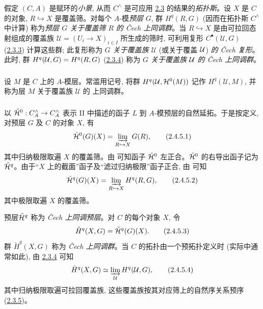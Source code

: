 \subsubsection{}
假定 $(C, A)$ 是赋环的\emph{小景}, 从而 $C^{\wedge}$ 是可应用 \hyperref[V.subsec2.3]{2.3} 的结果的\emph{拓扑斯}。设 $X$ 是 $C$ 的对象, $R \hookrightarrow X$ 是覆盖筛。对每个 $A$-模\emph{预层} $G$, 群 $H^{q}(R, G)$ (因而在拓扑斯 $C^{\wedge}$ 中计算) 称为\emph{预层 $G$ 关于覆盖筛 $R$ 的 Čech 上同调群}。当 $R \hookrightarrow X$ 是由可拉回态射组成的覆盖族 $\mathcal{U} = (U_i \to X)_{i \in I}$ 所生成的筛时, 可利用复形 $C^{∙}(\mathcal{U}, G)$ (\hyperref[V.subsubsec2.3.3]{2.3.3}) 计算这些群; 此复形称为 \emph{$G$ 关于覆盖族 $\mathcal{U}$} (或关于覆盖 ${\mathcal U}$) \emph{的 Čech 复形}。此时, 群 $H^{q}({\mathcal U},G)=H^{q}(R,G)$ (\hyperref[V.prop2.3.4]{2.3.4}) 称为 \emph{$G$ 关于覆盖族 ${\mathcal U}$ 的 Čech 上同调群}。

\subsubsection{}
设 $M$ 是 $C$ 上的 $A$-模层。常滥用记号, 将群 $H^q(\mathcal{U}, {\mathcal H}^{0}(M))$ 记作 $H^q(\mathcal{U}, M)$, 并称为层 $M$ 关于覆盖族 $\mathcal{U}$ 的  上同调群。

\subsubsection{}
以 $\check{\Hh}^0 : C^{\wedge}_A \to C^{\wedge}_A$ 表示 II 中描述的函子 $L$ 到 $A$-模预层的自然延拓。于是按定义, 对预层 $G$ 及 $C$ 的对象 $X$, 有
\begin{equation}
\check{{\mathcal H}}^0 (G) (X) = \varinjlim_{R \hookrightarrow X}
G(R){},\tag{2.4.5.1}
\end{equation}
其中归纳极限取遍 $X$ 的覆盖筛。由  可知函子 $\check{{\mathcal H}}^{0}$ 左正合。$\check{{\mathcal H}}^{0}$ 的右导出函子记为 $\check{{\mathcal H}}^{q}$。由于“$X$ 上的截面”函子及“滤过归纳极限”函子正合, 由  可知
\begin{equation}
\check{{\mathcal H}}^{q} (G) (X) = \varinjlim_{R \hookrightarrow
  X} H^q(R, G){},\tag{2.4.5.2}
\end{equation}
其中极限取遍 $X$ 的覆盖筛。

预层\pageoriginale $\check{{\mathcal H}}^{q}$ 称为 \emph{Čech 上同调预层}。对 $C$ 的每个对象 $X$, 令
\begin{equation*}
{\check{H}}^q (X, G) = \check{{\mathcal H}}^{q} (G) (X){}.\tag{2.4.5.3}
\end{equation*}
群 ${\check{H}}^q(X, G)$ 称为 \emph{Čech 上同调群}。当 $C$ 的拓扑由一个预拓扑定义时 (实际中通常如此), 由 \hyperref[V.prop2.3.4]{2.3.4} 可知
\begin{equation*}
{\check{H}}^q (X, G) \simeq \varinjlim_{\mathcal{U}} {H}^{q}
(\mathcal{U}, G){},\tag{2.4.5.4}
\end{equation*}
其中归纳极限取遍可拉回覆盖族, 这些覆盖族按其对应筛上的自然序关系预序 (\hyperref[V.cor2.3.5]{2.3.5})。

